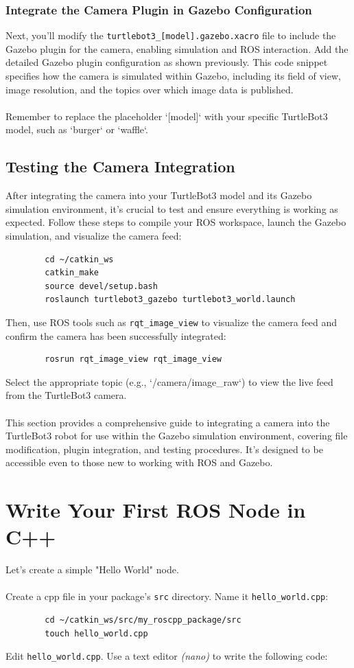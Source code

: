 \documentclass[12pt,a4paper]{article}
\begin{document}
	\subsubsection{Integrate the Camera Plugin in Gazebo Configuration}
	Next, you'll modify the \texttt{turtlebot3\_[model].gazebo.xacro} file to include the Gazebo plugin for the camera, enabling simulation and ROS interaction. Add the detailed Gazebo plugin configuration as shown previously. This code snippet specifies how the camera is simulated within Gazebo, including its field of view, image resolution, and the topics over which image data is published.
	\\\\
	Remember to replace the placeholder `[model]` with your specific TurtleBot3 model, such as `burger` or `waffle`.
	
	\subsection{Testing the Camera Integration}
	After integrating the camera into your TurtleBot3 model and its Gazebo simulation environment, it's crucial to test and ensure everything is working as expected. Follow these steps to compile your ROS workspace, launch the Gazebo simulation, and visualize the camera feed:
	
	\begin{verbatim}
		cd ~/catkin_ws
		catkin_make
		source devel/setup.bash
		roslaunch turtlebot3_gazebo turtlebot3_world.launch
	\end{verbatim}
	Then, use ROS tools such as \texttt{rqt\_image\_view} to visualize the camera feed and confirm the camera has been successfully integrated:
	
	\begin{verbatim}
		rosrun rqt_image_view rqt_image_view
	\end{verbatim}
	Select the appropriate topic (e.g., `/camera/image\_raw`) to view the live feed from the TurtleBot3 camera.
	\\\\
	This section provides a comprehensive guide to integrating a camera into the TurtleBot3 robot for use within the Gazebo simulation environment, covering file modification, plugin integration, and testing procedures. It's designed to be accessible even to those new to working with ROS and Gazebo.
	
	
	\section{Write Your First ROS Node in C++}
	Let's create a simple "Hello World" node.
	\\\\
	\noindent Create a cpp file in your package's \texttt{src} directory. Name it \texttt{hello\_world.cpp}:
	\begin{verbatim}
		cd ~/catkin_ws/src/my_roscpp_package/src
		touch hello_world.cpp
	\end{verbatim}
	Edit \texttt{hello\_world.cpp}. Use a text editor \textit{(nano)} to write the following code:
	
\end{document}
